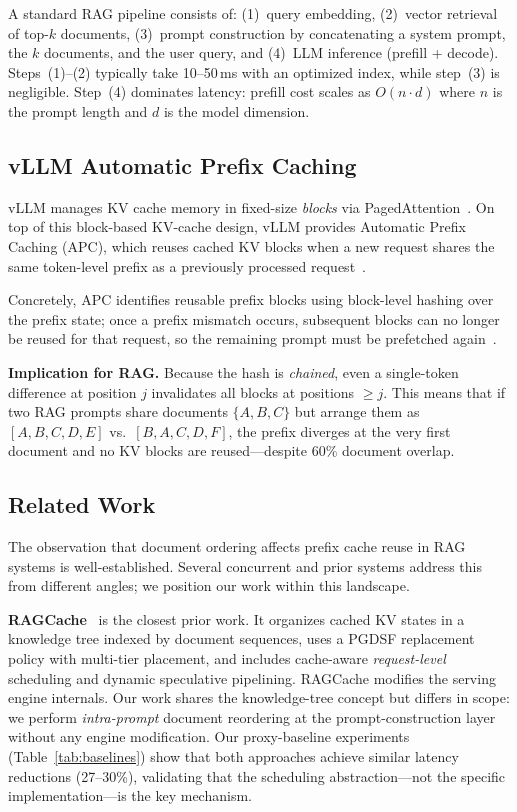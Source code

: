 \documentclass{article}
\begin{document}
A standard RAG pipeline consists of: (1)~query embedding, (2)~vector retrieval of top-$k$ documents, (3)~prompt construction by concatenating a system prompt, the $k$ documents, and the user query, and (4)~LLM inference (prefill + decode). Steps~(1)--(2) typically take 10--50\,ms with an optimized index, while step~(3) is negligible. Step~(4) dominates latency: prefill cost scales as $O(n \cdot d)$ where $n$ is the prompt length and $d$ is the model dimension.

\subsection{vLLM Automatic Prefix Caching}

vLLM manages KV cache memory in fixed-size \emph{blocks} via PagedAttention~\citep{kwon2023pagedattention}. On top of this block-based KV-cache design, vLLM provides Automatic Prefix Caching (APC), which reuses cached KV blocks when a new request shares the same token-level prefix as a previously processed request~\citep{vllm_apc}.

Concretely, APC identifies reusable prefix blocks using block-level hashing over the prefix state; once a prefix mismatch occurs, subsequent blocks can no longer be reused for that request, so the remaining prompt must be prefetched again~\citep{vllm_apc}.

\textbf{Implication for RAG.} Because the hash is \emph{chained}, even a single-token difference at position $j$ invalidates all blocks at positions $\geq j$. This means that if two RAG prompts share documents $\{A, B, C\}$ but arrange them as $[A, B, C, D, E]$ vs.\ $[B, A, C, D, F]$, the prefix diverges at the very first document and no KV blocks are reused---despite 60\% document overlap.

\subsection{Related Work}

The observation that document ordering affects prefix cache reuse in RAG systems is well-established. Several concurrent and prior systems address this from different angles; we position our work within this landscape.

\textbf{RAGCache}~\citep{jin2025ragcache} is the closest prior work. It organizes cached KV states in a knowledge tree indexed by document sequences, uses a PGDSF replacement policy with multi-tier placement, and includes cache-aware \emph{request-level} scheduling and dynamic speculative pipelining. RAGCache modifies the serving engine internals. Our work shares the knowledge-tree concept but differs in scope: we perform \emph{intra-prompt} document reordering at the prompt-construction layer without any engine modification. Our proxy-baseline experiments (Table~\ref{tab:baselines}) show that both approaches achieve similar latency reductions (27--30\%), validating that the scheduling abstraction---not the specific implementation---is the key mechanism.
\end{document}
